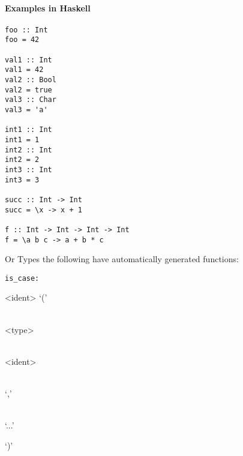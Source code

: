 \documentclass{article}
\def\H{Haskell}
\def\pend{\mbox{} \\\\}
\begin{document}
\paragraph{Examples in \H}
\begin{verbatim}
foo :: Int
foo = 42

val1 :: Int
val1 = 42
val2 :: Bool
val2 = true
val3 :: Char
val3 = 'a'

int1 :: Int
int1 = 1
int2 :: Int
int2 = 2
int3 :: Int
int3 = 3

succ :: Int -> Int
succ = \x -> x + 1

f :: Int -> Int -> Int -> Int
f = \a b c -> a + b * c
\end{verbatim}

Or Types the following have automatically generated functions:

\begin{verbatim}
is_case:
\end{verbatim}

%

%
%


\begin{syntdiag}
<ident> ‘(’
\begin{rep} \begin{stack} \\
<type> \begin{stack} \\ <ident> \end{stack}
\end{stack} \\ ‘,’ \end{rep}
\begin{stack} \\ ‘...’ \end{stack} ‘)’
\end{syntdiag}
\end{document}
